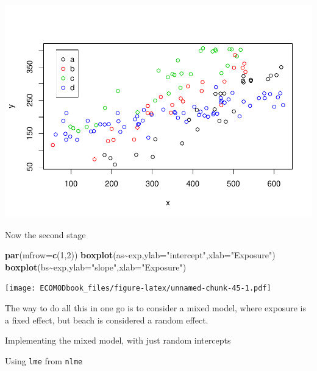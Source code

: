 \documentclass[
]{book}
\newenvironment{Shaded}{\begin{snugshade}}{\end{snugshade}}
\newcommand{\AttributeTok}[1]{\textcolor[rgb]{0.13,0.29,0.53}{#1}}
\newcommand{\DecValTok}[1]{\textcolor[rgb]{0.00,0.00,0.81}{#1}}
\newcommand{\FunctionTok}[1]{\textcolor[rgb]{0.13,0.29,0.53}{\textbf{#1}}}
\newcommand{\NormalTok}[1]{#1}
\newcommand{\OtherTok}[1]{\textcolor[rgb]{0.56,0.35,0.01}{#1}}
\newcommand{\SpecialCharTok}[1]{\textcolor[rgb]{0.81,0.36,0.00}{\textbf{#1}}}
\newcommand{\StringTok}[1]{\textcolor[rgb]{0.31,0.60,0.02}{#1}}
\begin{document}
\includegraphics{ECOMODbook_files/figure-latex/unnamed-chunk-44-1.pdf}

Now the second stage

\begin{Shaded}
\begin{Highlighting}[]
\FunctionTok{par}\NormalTok{(}\AttributeTok{mfrow=}\FunctionTok{c}\NormalTok{(}\DecValTok{1}\NormalTok{,}\DecValTok{2}\NormalTok{))}
\FunctionTok{boxplot}\NormalTok{(as}\SpecialCharTok{\textasciitilde{}}\NormalTok{exp,}\AttributeTok{ylab=}\StringTok{"intercept"}\NormalTok{,}\AttributeTok{xlab=}\StringTok{"Exposure"}\NormalTok{)}
\FunctionTok{boxplot}\NormalTok{(bs}\SpecialCharTok{\textasciitilde{}}\NormalTok{exp,}\AttributeTok{ylab=}\StringTok{"slope"}\NormalTok{,}\AttributeTok{xlab=}\StringTok{"Exposure"}\NormalTok{)}
\end{Highlighting}
\end{Shaded}

\texttt{[image: ECOMODbook\_files/figure-latex/unnamed-chunk-45-1.pdf]}

The way to do all this in one go is to consider a mixed model, where exposure is a fixed effect, but beach is considered a random effect.

Implementing the mixed model, with just random intercepts

Using \texttt{lme} from \texttt{nlme}

\begin{Shaded}
\end{Shaded}
\end{document}
